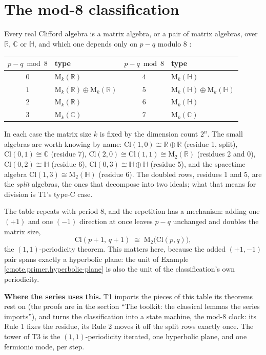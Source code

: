\documentclass[11pt]{article}
\theoremstyle{definition}
\theoremstyle{plain}
\providecommand{\C}{}\renewcommand{\C}{\mathbb{C}}
\providecommand{\Cl}{}\renewcommand{\Cl}{\mathrm{Cl}}
\providecommand{\HH}{}\renewcommand{\HH}{\mathbb{H}}
\providecommand{\Mat}{}\renewcommand{\Mat}{\mathrm{M}}
\providecommand{\R}{}\renewcommand{\R}{\mathbb{R}}
\begin{document}
\section{The mod-8 classification}

\label{c:note.primer.setting-mod-8-classification}
Every real Clifford algebra is a matrix algebra, or a pair of matrix algebras, over $\R$, $\C$ or $\HH$, and which one depends only on $p - q$ modulo 8 \cite{ABS1964, Porteous1995, Lounesto2001}:

\begin{center}
\begin{tabular}{cl@{\qquad}cl}
\toprule
$p-q \bmod 8$ & type & $p-q \bmod 8$ & type \\
\midrule
$0$ & $\Mat_k(\R)$              & $4$ & $\Mat_k(\HH)$ \\
$1$ & $\Mat_k(\R) \oplus \Mat_k(\R)$ & $5$ & $\Mat_k(\HH) \oplus \Mat_k(\HH)$ \\
$2$ & $\Mat_k(\R)$              & $6$ & $\Mat_k(\HH)$ \\
$3$ & $\Mat_k(\C)$              & $7$ & $\Mat_k(\C)$ \\
\bottomrule
\end{tabular}
\end{center}

\noindent In each case the matrix size $k$ is fixed by the dimension count $2^{n}$. The small algebras are worth knowing by name: $\Cl(1,0) \cong \R \oplus \R$ (residue 1, split), $\Cl(0,1) \cong \C$ (residue 7), $\Cl(2,0) \cong \Cl(1,1) \cong \Mat_2(\R)$ (residues 2 and 0), $\Cl(0,2) \cong \HH$ (residue 6), $\Cl(0,3) \cong \HH \oplus \HH$ (residue 5), and the spacetime algebra $\Cl(1,3) \cong \Mat_2(\HH)$ (residue 6). The doubled rows, residues 1 and 5, are the \emph{split} algebras, the ones that decompose into two ideals; what that means for division is T1's type-C case.

The table repeats with period 8, and the repetition has a mechanism: adding one $(+1)$ and one $(-1)$ direction at once leaves $p - q$ unchanged and doubles the matrix size,
\[
\Cl(p{+}1,\, q{+}1) \;\cong\; \Mat_2\bigl(\Cl(p,q)\bigr),
\]
the $(1,1)$-periodicity theorem. This matters here, because the added $(+1,-1)$ pair spans exactly a hyperbolic plane: the unit of Example \ref{c:note.primer.hyperbolic-plane} is also the unit of the classification's own periodicity.

\label{c:note.primer.setting-mod-8-classification-2}
\textbf{Where the series uses this.} T1 imports the pieces of this table its theorems rest on (the proofs are in the section ``The toolkit: the classical lemmas the series imports''), and turns the classification into a state machine, the mod-8 clock: its Rule 1 fixes the residue, its Rule 2 moves it off the split rows exactly once. The tower of T3 is the $(1,1)$-periodicity iterated, one hyperbolic plane, and one fermionic mode, per step.
\end{document}
